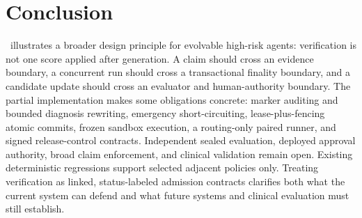\section{Conclusion}
\label{sec:conclusion}

\system\ illustrates a broader design principle for evolvable high-risk agents:
verification is not one score applied after generation.  A claim should cross
an evidence boundary, a concurrent run should cross a transactional finality
boundary, and a candidate update should cross an evaluator and human-authority
boundary.  The partial implementation makes some obligations concrete:
marker auditing and bounded diagnosis rewriting, emergency short-circuiting,
lease-plus-fencing atomic commits, frozen sandbox execution, a routing-only
paired runner, and signed release-control contracts.  Independent sealed
evaluation, deployed approval authority, broad claim enforcement, and
clinical validation remain open.  Existing deterministic regressions support
selected adjacent policies only.  Treating verification as linked,
status-labeled admission contracts clarifies both what the current system can
defend and what future systems and clinical evaluation must still establish.
